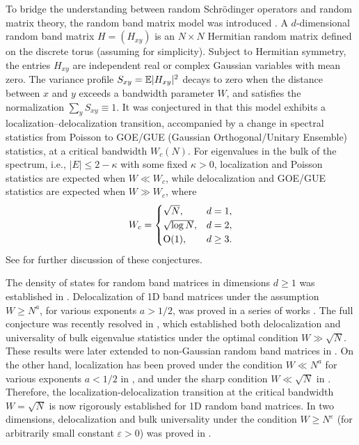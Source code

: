 To bridge the understanding between random Schr{\"o}dinger operators and random matrix theory, the random band matrix model was introduced \cite{PhysRevLett.64.1851, PhysRevLett.64.5, PhysRevLett.66.986}. A $d$-dimensional random band matrix $H = (H_{xy})$ is an $N\times N$ Hermitian random matrix defined on the discrete torus  (assuming  for simplicity). Subject to Hermitian symmetry, the entries $H_{xy}$ are independent real or complex Gaussian variables with mean zero. The variance profile $S_{xy} = \mathbb{E}|H_{xy}|^{2}$ decays to zero when the distance between $x$ and $y$ exceeds a bandwidth parameter $W$, and satisfies the normalization $\sum_y S_{xy} \equiv 1$. 
It was conjectured in \cite{PhysRevLett.64.1851, PhysRevLett.64.5, PhysRevLett.66.986,PhysRevLett.67.2405} that this model exhibits a localization--delocalization transition, accompanied by a change in spectral statistics from Poisson to GOE/GUE (Gaussian Orthogonal/Unitary Ensemble) statistics, at a critical bandwidth $W_c(N)$. For eigenvalues in the bulk of the spectrum, i.e., $|E| \le 2 - \kappa$ with some fixed $\kappa > 0$, localization and Poisson statistics are expected when $W \ll W_c$, while delocalization and GOE/GUE statistics are expected when $W \gg W_c$, where
\begin{equation}\label{eqn:transition exponents}
W_c =
\begin{cases}
\sqrt N, & d=1, \\
\sqrt{ \log N}, & d=2, \\
\operatorname{O}(1), & d\ge 3.
\end{cases}
\end{equation}
See \cite{PB_review, Spencer2, Spencer3, Spencer1} for further discussion of these conjectures.

The density of states for random band matrices in dimensions $d \ge 1$ was established in \cite{DisPinSpe2002}.
Delocalization of 1D band matrices under the assumption $W \geq N^{a}$, for various exponents $a > 1/2$, was proved in a series of works \cite{EK_band1, ErdKno2011, erdHos2013local, BaoErd2015, HeMa2018, bourgade2017universality, bourgade2019random, bourgade2020random, yang2021random, DY}. The full conjecture was recently resolved in \cite{YY_25}, which established both delocalization and universality of bulk eigenvalue statistics under the optimal condition $W \gg \sqrt N$. These results were later extended to non-Gaussian random band matrices in \cite{erdHos2025zigzag}. 
On the other hand, localization has been proved under the condition $W \ll N^{a}$ for various exponents $a < 1/2$ in \cite{Sch2009, PelSchShaSod,Cipolloni2024, Chen2022}, and under the sharp condition $W \ll \sqrt N$ in \cite{Localization1_2}. Therefore, the localization-delocalization transition at the critical bandwidth $W = \sqrt N$ is now rigorously established for 1D random band matrices.
In two dimensions, delocalization and bulk universality under the condition $W \ge N^{\varepsilon}$ (for arbitrarily small constant $\varepsilon > 0$) was proved in \cite{DYYY25}.


